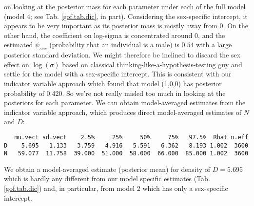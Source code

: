 on looking at the posterior mass for each parameter under each of the
full model (model 4; see Tab. \ref{gof.tab.dic}, in part). Considering
the sex-specific intercept, it appears to be very important as its
posterior mass is mostly away from 0.  On the other hand, the
coefficient on log-sigma is concentrated around 0, and the estimated
$\psi_{sex}$ (probability that an individual is a male) is $0.54$ with
a large posterior standard deviation.  We might therefore be inclined
to discard the sex effect on $\log(\sigma)$ based on classical
thinking-like-a-hypothesis-testing guy and settle for the model with a
sex-specific intercept. This is consistent with our indicator variable
approach which found that model (1,0,0) has posterior probability of
0.420. So we're not really misled too much in looking at the
posteriors for each parameter.  We can obtain model-averaged estimates
from the indicator variable approach, which produces direct
model-averaged estimates of $N$ and $D$:
{\small
\begin{verbatim}
   mu.vect sd.vect    2.5%     25%     50%     75%   97.5%  Rhat n.eff
D    5.695   1.133   3.759   4.916   5.591   6.362   8.193 1.002  3600
N   59.077  11.758  39.000  51.000  58.000  66.000  85.000 1.002  3600
\end{verbatim}
}
We obtain a model-averaged estimate (posterior mean) for density of $D=5.695$
which is hardly any different from our
model specific estimates (Tab. \ref{gof.tab.dic}) and, in particular, from model 2
which has only a sex-specific intercept.



\begin{comment}
XXXX MIGHT BE GOOD TO HAVE THIS BUT OPTIONAL XXXXXXXXXXX
\subsection{Sensitivity to Prior Distributions}

{\bf XXXXXXXXXXX TO BE DONE XXXXXXXXXX}

Discussion of sensitivity to prior ......
Results of DIC and model indicator variable analyses were based on
unif(-3,3) priors for the parameters. This keeps them in the ballpark
when they are not in the model. We tried a different prior:
normal(0,.1) which you can do just by editing the function
 \mbox{\tt wolvSCR0ms}.
Doing the DIC analysis changes the result to XXXXXXXXXXXXX

The indicator variable analysis was rerun and that produces XXXXXXXXXXXXXXX
We modified
 the {\bf R} script to run the same model
but with \mbox{\tt dnorm(0,.1)} prior distributions, producing the
following results:  {\bf XXXXX RERUN THIS XXXXXXX}
\begin{verbatim}
> mod<-toad5$BUGSoutput$sims.list$mod
> mod<-paste(mod[,1],mod[,2])
> table(mod)/length(mod)

mod
       0 0        0 1        1 0        1 1
0.43945000 0.02185000 0.50708333 0.03161667
\end{verbatim}
\end{comment}

